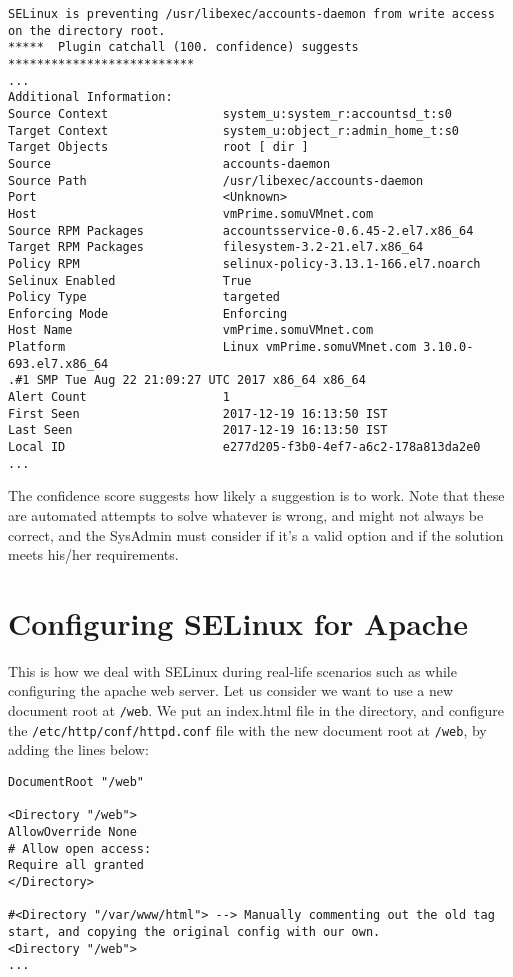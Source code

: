 \vspace{-15pt}
\begin{verbatim}
SELinux is preventing /usr/libexec/accounts-daemon from write access on the directory root.
*****  Plugin catchall (100. confidence) suggests   **************************
...
Additional Information:
Source Context                system_u:system_r:accountsd_t:s0
Target Context                system_u:object_r:admin_home_t:s0
Target Objects                root [ dir ]
Source                        accounts-daemon
Source Path                   /usr/libexec/accounts-daemon
Port                          <Unknown>
Host                          vmPrime.somuVMnet.com
Source RPM Packages           accountsservice-0.6.45-2.el7.x86_64
Target RPM Packages           filesystem-3.2-21.el7.x86_64
Policy RPM                    selinux-policy-3.13.1-166.el7.noarch
Selinux Enabled               True
Policy Type                   targeted
Enforcing Mode                Enforcing
Host Name                     vmPrime.somuVMnet.com
Platform                      Linux vmPrime.somuVMnet.com 3.10.0-693.el7.x86_64
.#1 SMP Tue Aug 22 21:09:27 UTC 2017 x86_64 x86_64
Alert Count                   1
First Seen                    2017-12-19 16:13:50 IST
Last Seen                     2017-12-19 16:13:50 IST
Local ID                      e277d205-f3b0-4ef7-a6c2-178a813da2e0
...
\end{verbatim}
\vspace{-10pt}

\noindent
The confidence score suggests how likely a suggestion is to work. Note that these are automated attempts to solve whatever is wrong, and might not always be correct, and the SysAdmin must consider if it's a valid option and if the solution meets his/her requirements. 

\section{Configuring SELinux for Apache}
This is how we deal with SELinux during real-life scenarios such as while configuring the apache web server. Let us consider we want to use a new document root at \verb|/web|. We put an index.html file in the directory, and configure the \verb|/etc/http/conf/httpd.conf| file with the new document root at \verb|/web|, by adding the lines below:

\vspace{-15pt}
\begin{verbatim}
DocumentRoot "/web"

<Directory "/web">
AllowOverride None
# Allow open access:
Require all granted
</Directory>

#<Directory "/var/www/html"> --> Manually commenting out the old tag start, and copying the original config with our own. 
<Directory "/web">
...
\end{verbatim}
\vspace{-10pt}

